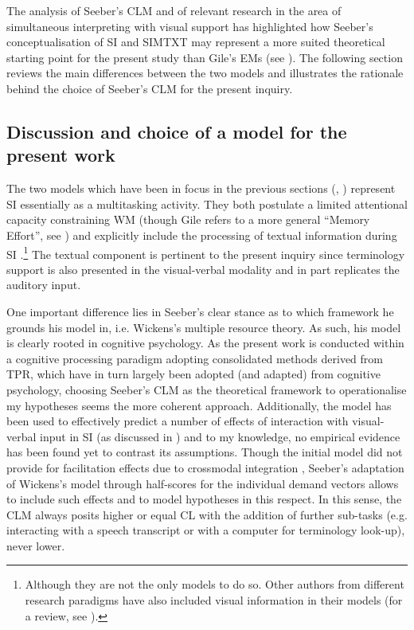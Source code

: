 The analysis of Seeber's CLM and of relevant research in the area of simultaneous interpreting with visual support has highlighted how Seeber's conceptualisation of SI and SIMTXT may represent a more suited theoretical starting point for the present study than Gile's EMs (see ). The following section reviews the main differences between the two models and illustrates the rationale behind the choice of Seeber's CLM for the present inquiry.

\subsection{Discussion and choice of a model for the present work} \label{choiceofmodel}
The two models which have been in focus in the previous sections (, ) represent SI essentially as a multitasking activity. They both postulate a limited attentional capacity constraining WM (though Gile refers to a more general ``Memory Effort'', see \citealt{gile_basic_2009}) and explicitly include the processing of textual information during SI \citep{gile_basic_2009,gile_2020_2020,seeber_multimodal_2017}.\footnote{Although they are not the only models to do so. Other authors from different research paradigms have also included visual information in their models (for a review, see \citealt{seubert_visuelle_2019}).} The textual component is pertinent to the present inquiry since terminology support is also presented in the visual-verbal modality and in part replicates the auditory input.





One important difference lies in Seeber's clear stance as to which framework he grounds his model in, i.e. Wickens's multiple resource theory. As such, his model is clearly rooted in cognitive psychology. As the present work is conducted within a cognitive processing paradigm adopting consolidated methods derived from TPR, which have in turn largely been adopted (and adapted) from cognitive psychology, choosing Seeber's CLM as the theoretical framework to operationalise my hypotheses seems the more coherent approach. Additionally, the model has been used to effectively predict a number of effects of interaction with visual-verbal input in SI (as discussed in ) and to my knowledge, no empirical evidence has been found yet to contrast its assumptions. Though the initial model did not provide for facilitation effects due to crossmodal integration \citep{seeber_thinking_2007}, Seeber's adaptation of Wickens's model through half-scores for the individual demand vectors allows to include such effects and to model hypotheses in this respect. In this sense, the CLM always posits higher or equal CL with the addition of further sub-tasks (e.g. interacting with a speech transcript or with a computer for terminology look-up), never lower.

